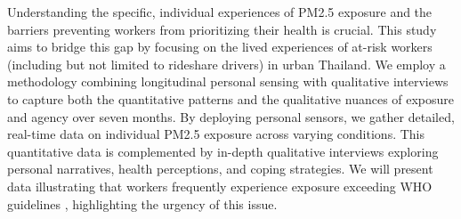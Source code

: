 Understanding the specific, individual experiences of PM2.5 exposure and the barriers preventing workers from prioritizing their health is crucial.
This study aims to bridge this gap by focusing on the lived experiences of at-risk workers (including but not limited to rideshare drivers) in urban Thailand.
We employ a methodology combining longitudinal personal sensing with qualitative interviews to capture both the quantitative patterns and the qualitative nuances of exposure and agency over seven months.
By deploying personal sensors, we gather detailed, real-time data on individual PM2.5 exposure across varying conditions.
This quantitative data is complemented by in-depth qualitative interviews exploring personal narratives, health perceptions, and coping strategies.
We will present data illustrating that workers frequently experience exposure exceeding WHO guidelines \cite{who_aqg_2021}, highlighting the urgency of this issue.


    
